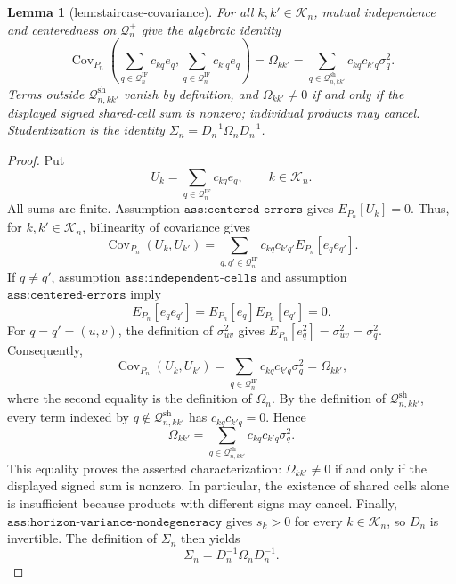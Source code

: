 \documentclass{article}
\newtheorem{lemma}{Lemma}
\begin{document}
\begin{lemma}[lem:staircase-covariance]\label{lem:staircase-covariance}
For all \(k,k'\in\mathcal K_n\), mutual independence and centeredness on \(\mathcal Q_n^+\) give the algebraic identity \[\operatorname{Cov}_{P_n}\!\left(\sum_{q\in\mathcal Q_n^{\mathrm{IF}}}c_{kq}e_q,\sum_{q\in\mathcal Q_n^{\mathrm{IF}}}c_{k'q}e_q\right)=\Omega_{kk'}=\sum_{q\in\mathcal Q_{n,kk'}^{\mathrm{sh}}}c_{kq}c_{k'q}\sigma_q^2.\] Terms outside \(\mathcal Q_{n,kk'}^{\mathrm{sh}}\) vanish by definition, and \(\Omega_{kk'}\ne0\) if and only if the displayed signed shared-cell sum is nonzero; individual products may cancel. Studentization is the identity \(\Sigma_n=D_n^{-1}\Omega_nD_n^{-1}\).
\end{lemma}
\begin{proof}
Put
\[
 U_k=\sum_{q\in\mathcal Q_n^{\mathrm{IF}}}c_{kq}e_q,
 \qquad k\in\mathcal K_n.
\]
All sums are finite.  Assumption \(\texttt{ass:centered-errors}\) gives
\(E_{P_n}[U_k]=0\).  Thus, for \(k,k'\in\mathcal K_n\), bilinearity of
covariance gives
\[
 \operatorname{Cov}_{P_n}(U_k,U_{k'})
 =\sum_{q,q'\in\mathcal Q_n^{\mathrm{IF}}}
 c_{kq}c_{k'q'}E_{P_n}[e_qe_{q'}].
\]
If \(q\ne q'\), assumption \(\texttt{ass:independent-cells}\) and
assumption \(\texttt{ass:centered-errors}\) imply
\[
 E_{P_n}[e_qe_{q'}]
 =E_{P_n}[e_q]E_{P_n}[e_{q'}]=0.
\]
For \(q=q'=(u,v)\), the definition of \(\sigma_{uv}^2\) gives
\(E_{P_n}[e_q^2]=\sigma_{uv}^2=\sigma_q^2\).  Consequently,
\[
 \operatorname{Cov}_{P_n}(U_k,U_{k'})
 =\sum_{q\in\mathcal Q_n^{\mathrm{IF}}}c_{kq}c_{k'q}\sigma_q^2
 =\Omega_{kk'},
\]
where the second equality is the definition of \(\Omega_n\).  By the
definition of \(\mathcal Q_{n,kk'}^{\mathrm{sh}}\), every term indexed by
\(q\notin\mathcal Q_{n,kk'}^{\mathrm{sh}}\) has
\(c_{kq}c_{k'q}=0\).  Hence
\[
 \Omega_{kk'}
 =\sum_{q\in\mathcal Q_{n,kk'}^{\mathrm{sh}}}
 c_{kq}c_{k'q}\sigma_q^2.
\]
This equality proves the asserted characterization: \(\Omega_{kk'}\ne0\)
if and only if the displayed signed sum is nonzero.  In particular, the
existence of shared cells alone is insufficient because products with
different signs may cancel.  Finally,
\(\texttt{ass:horizon-variance-nondegeneracy}\) gives \(s_k>0\) for every
\(k\in\mathcal K_n\), so \(D_n\) is invertible.  The definition of
\(\Sigma_n\) then yields
\[
 \Sigma_n=D_n^{-1}\Omega_nD_n^{-1}.
\]
\end{proof}
\end{document}
